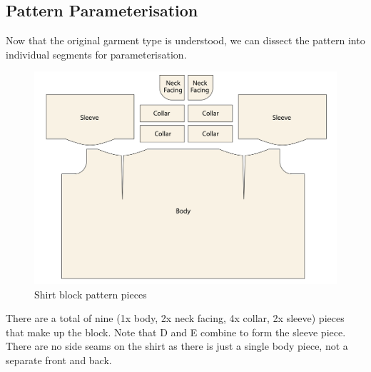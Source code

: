 \subsection{Pattern Parameterisation}
Now that the original garment type is understood, we can dissect the pattern into individual segments for parameterisation.
\begin{figure} [H] 
    \centering 
    \includegraphics[width = \textwidth]{Images/originalpattern_pieces.png} 
    \caption{Shirt block pattern pieces}
\end{figure}
There are a total of nine (1x body, 2x neck facing, 4x collar, 2x sleeve) pieces that make up the block. Note that D and E combine to form the sleeve piece. There are no side seams on the shirt as there is just a single body piece, not a separate front and back.

